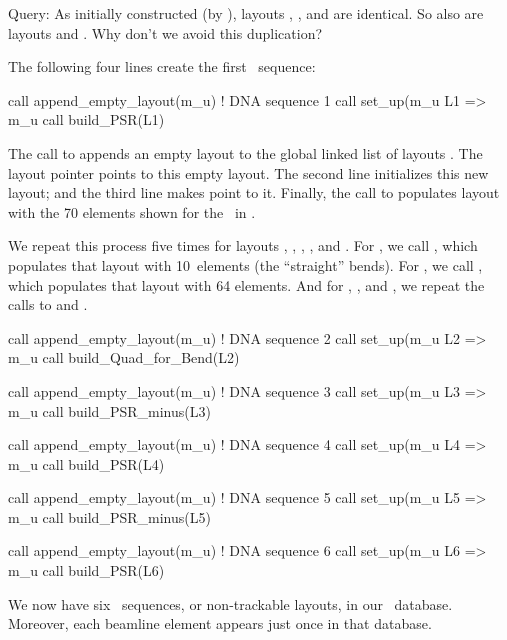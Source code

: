 Query: As initially constructed (by ), layouts ,
, and  are identical. So also are layouts  and
. Why don't we avoid this duplication?%

%
The following four lines create the first \DNA\ sequence:
%
\begin{ptccode}
call append_empty_layout(m_u) ! DNA sequence 1
call set_up(m_u%
L1 => m_u%
call build_PSR(L1)
\end{ptccode}
%
The call to  appends an empty layout to
the global linked list of layouts . The layout pointer
 points to this empty layout. The second line
initializes this new layout; and the third line makes  point
to it. Finally, the call to  populates layout 
with the 70 elements shown for the \PSR\ in .

We repeat this process five times for layouts , ,
, , and . For , we call
, which populates that layout with 10~elements
(the ``straight'' bends). For , we call ,
which populates that layout with 64 elements. And for ,
, and , we repeat the calls to  and
.
%
\begin{ptccode}
call append_empty_layout(m_u) ! DNA sequence 2
call set_up(m_u%
L2 => m_u%
call build_Quad_for_Bend(L2)

call append_empty_layout(m_u) ! DNA sequence 3
call set_up(m_u%
L3 => m_u%
call build_PSR_minus(L3)

call append_empty_layout(m_u) ! DNA sequence 4
call set_up(m_u%
L4 => m_u%
call build_PSR(L4)

call append_empty_layout(m_u) ! DNA sequence 5
call set_up(m_u%
L5 => m_u%
call build_PSR_minus(L5)

call append_empty_layout(m_u) ! DNA sequence 6
call set_up(m_u%
L6 => m_u%
call build_PSR(L6)
\end{ptccode}
%
We now have six \DNA\ sequences, or non-trackable layouts, in our
\DNA\ database. Moreover, each beamline element appears just once
in that database.


